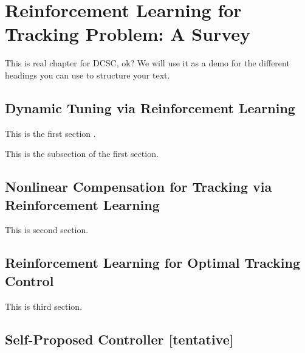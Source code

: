 %
\chapter{Reinforcement Learning for Tracking Problem: A Survey}

This is real chapter for \ac{DCSC}, ok? We will use it as a demo for the different headings you can use to structure your text.


\section{Dynamic Tuning via Reinforcement Learning}
This is the first section .

This is the subsection of the first section.

\section{Nonlinear Compensation for Tracking via Reinforcement Learning}
This is second section.

\section{Reinforcement Learning for Optimal Tracking Control}
This is third section.

\section{Self-Proposed Controller [tentative]}

